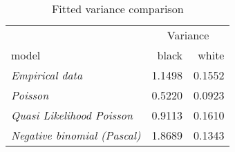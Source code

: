 \begin{wraptable}{r}{3.5in}

\caption{\label{tab:variance_comparison}Fitted variance comparison}
\centering
\fontsize{9}{11}\selectfont
\begin{tabular}[t]{>{}lrr}
\toprule
\multicolumn{1}{c}{ } & \multicolumn{2}{c}{Variance} \\
\cmidrule(l{3pt}r{3pt}){2-3}
model & black & white\\
\midrule
\em{Empirical data} & 1.1498 & 0.1552\\
\em{Poisson} & 0.5220 & 0.0923\\
\em{Quasi Likelihood Poisson} & 0.9113 & 0.1610\\
\em{Negative binomial (Pascal)} & 1.8689 & 0.1343\\
\bottomrule
\end{tabular}
\end{wraptable}

